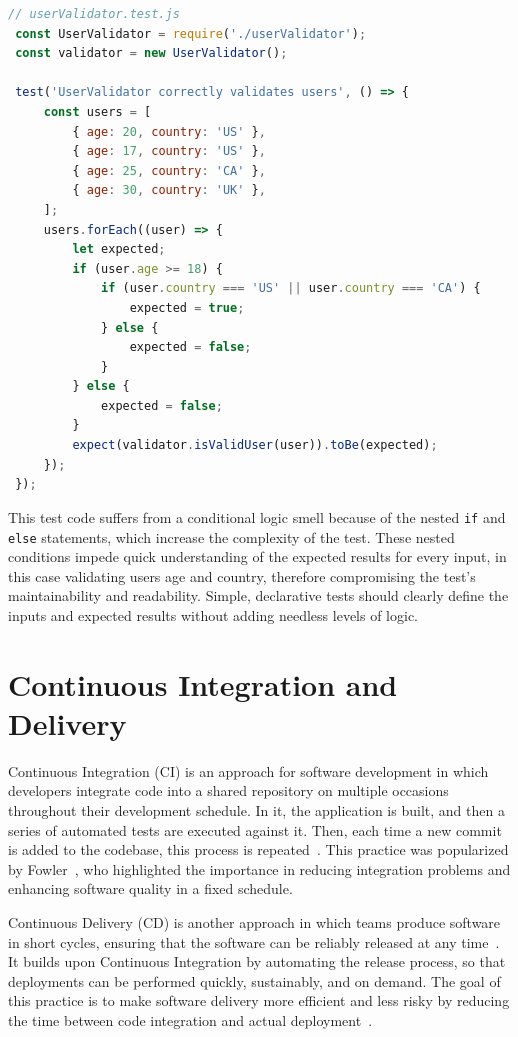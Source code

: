 \documentclass[
	msc, %
	english %
]{../ppgccufmg}
\begin{document}
                \begin{lstlisting}[language=javascript, caption= Conditional logic test smell example, label=lst:conditional-logic-test-smell-example]
 // userValidator.test.js
 const UserValidator = require('./userValidator');
 const validator = new UserValidator();

 test('UserValidator correctly validates users', () => {
     const users = [
         { age: 20, country: 'US' },
         { age: 17, country: 'US' },
         { age: 25, country: 'CA' },
         { age: 30, country: 'UK' },
     ];
     users.forEach((user) => {
         let expected;
         if (user.age >= 18) {
             if (user.country === 'US' || user.country === 'CA') {
                 expected = true;
             } else {
                 expected = false;
             }
         } else {
             expected = false;
         }
         expect(validator.isValidUser(user)).toBe(expected);
     });
 });
         \end{lstlisting} 

         This test code suffers from a conditional logic smell because of the nested \texttt{if} and \texttt{else} statements, which increase the complexity of the test. These nested conditions impede quick understanding of the expected results for every input, in this case validating users age and country, therefore compromising the test's maintainability and readability. Simple, declarative tests should clearly define the inputs and expected results without adding needless levels of logic.

    \section{Continuous Integration and Delivery}\label{sec:ch2-ci}

    Continuous Integration (CI) is an approach for software development in which developers integrate code into a shared repository on multiple occasions throughout their development schedule. In it, the application is built, and then a series of automated tests are executed against it. Then, each time a new commit is added to the codebase, this process is repeated~\cite{Bass2015}. This practice was popularized by Fowler~\cite{fowler2006ci}, who highlighted the importance in reducing integration problems and enhancing software quality in a fixed schedule.

    Continuous Delivery (CD) is another approach in which teams produce software in short cycles, ensuring that the software can be reliably released at any time~\cite{humble2010}. It builds upon Continuous Integration by automating the release process, so that deployments can be performed quickly, sustainably, and on demand. The goal of this practice is to make software delivery more efficient and less risky by reducing the time between code integration and actual deployment~\cite{Bass2015}.
\end{document}
